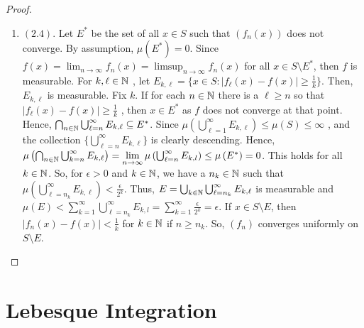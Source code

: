 \begin{proof}
\begin{enumerate}
		\item \(\left( 2.4 \right) \). Let \(E^{*}\) be the set of all \(x \in S\)  such that \(\left( f_{n}\left( x \right)  \right) \) does not converge. By assumption, \( \mu\left( E^{*} \right)  = 0\). Since \(f\left( x \right) = \lim_{n \to \infty}f_{n}\left( x \right) = \limsup_{n \to \infty} f_{n}\left( x \right) \) for all \(x \in S \setminus E^{*}\), then \(f\) is measurable. For \(k, \ell \in \mathbb{N}\) , let \(E_{k, \ell} = \{x \in S : \left| f_{\ell}\left( x \right) - f\left( x \right)  \right| \ge \frac{1}{k}\} \). Then, \(E_{k, \ell}\) is measurable. Fix \(k\). If for each \( n \in \mathbb{N}\) there is a \(\ell \ge n\) so that \(\left| f_{\ell}\left( x \right)  - f\left( x \right)  \right|\ge \frac{1}{k} \) , then \(x \in E^{*}\) as \(f\) does not converge at that point. Hence, \(\bigcap_{n \in \mathbb{N}} \bigcup_{\ell = n} ^{\infty}E_{k, \ell} \subseteq E^{*}\). Since \( \mu\left( \bigcup_{\ell=1} ^{\infty}E_{k, \ell} \right) \le \mu\left( S \right)  \le \infty \) , and the collection \(\{\bigcup_{\ell = n} ^{\infty}E_{k, \ell}\} \) is clearly descending. Hence, \( \mu \left( \bigcap_{n \in \N} \bigcup_{k=n} ^{\infty}E_{k, \ell} \right) = \lim_{n \to \infty} \mu \left( \bigcup_{\ell=n} ^{\infty}E_{k, l} \right) \le \mu\left( E^{*} \right) = 0 \). This holds for all \(k \in \mathbb{N}\). So, for \(\epsilon > 0\) and \(k \in \mathbb{N}\), we have a \(n_{k} \in \mathbb{N}\) such that \( \mu\left( \bigcup_{\ell = n_{k}} ^{\infty} E_{k, \ell} \right) < \frac{\epsilon}{2^{k}}\). Thus, \(E = \bigcup_{k \in \mathbb{N}} \bigcup_{\ell = n_{k}}^{\infty} E_{k, \ell}  \) is measurable and \( \mu\left( E \right)  < \sum_{k=1}^{\infty} \bigcup_{\ell= n_{k}}^{\infty}E_{k, l} = \sum_{k=1}^{\infty} \frac{\epsilon}{2^{k}} = \epsilon \). If \(x \in S \setminus E\), then \(\left| f_{n}\left( x \right) - f\left( x \right)  \right| < \frac{1}{k}\) for \(k \in \mathbb{N}\) if \(n \ge n_{k}\). So, \(\left( f_{n} \right) \) converges uniformly on \(S \setminus E\).

	\end{enumerate}
\end{proof}
\section{Lebesque Integration}
